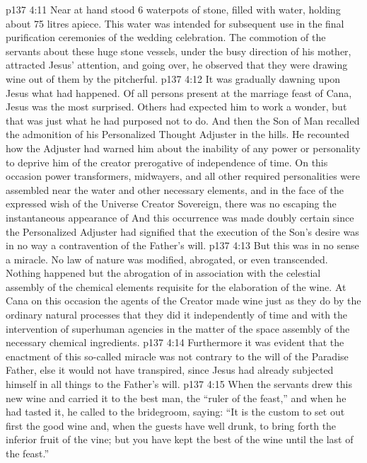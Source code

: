 \vs p137 4:11 Near at hand stood 6 waterpots of stone, filled with water, holding about 75 litres apiece. This water was intended for subsequent use in the final purification ceremonies of the wedding celebration. The commotion of the servants about these huge stone vessels, under the busy direction of his mother, attracted Jesus’ attention, and going over, he observed that they were drawing wine out of them by the pitcherful.
\vs p137 4:12 It was gradually dawning upon Jesus what had happened. Of all persons present at the marriage feast of Cana, Jesus was the most surprised. Others had expected him to work a wonder, but that was just what he had purposed not to do. And then the Son of Man recalled the admonition of his Personalized Thought Adjuster in the hills. He recounted how the Adjuster had warned him about the inability of any power or personality to deprive him of the creator prerogative of independence of time. On this occasion power transformers, midwayers, and all other required personalities were assembled near the water and other necessary elements, and in the face of the expressed wish of the Universe Creator Sovereign, there was no escaping the instantaneous appearance of  And this occurrence was made doubly certain since the Personalized Adjuster had signified that the execution of the Son’s desire was in no way a contravention of the Father’s will.
\vs p137 4:13 But this was in no sense a miracle. No law of nature was modified, abrogated, or even transcended. Nothing happened but the abrogation of  in association with the celestial assembly of the chemical elements requisite for the elaboration of the wine. At Cana on this occasion the agents of the Creator made wine just as they do by the ordinary natural processes  that they did it independently of time and with the intervention of superhuman agencies in the matter of the space assembly of the necessary chemical ingredients.
\vs p137 4:14 Furthermore it was evident that the enactment of this so\hyp{}called miracle was not contrary to the will of the Paradise Father, else it would not have transpired, since Jesus had already subjected himself in all things to the Father’s will.
\vs p137 4:15 \pc When the servants drew this new wine and carried it to the best man, the “ruler of the feast,” and when he had tasted it, he called to the bridegroom, saying: “It is the custom to set out first the good wine and, when the guests have well drunk, to bring forth the inferior fruit of the vine; but you have kept the best of the wine until the last of the feast.”
